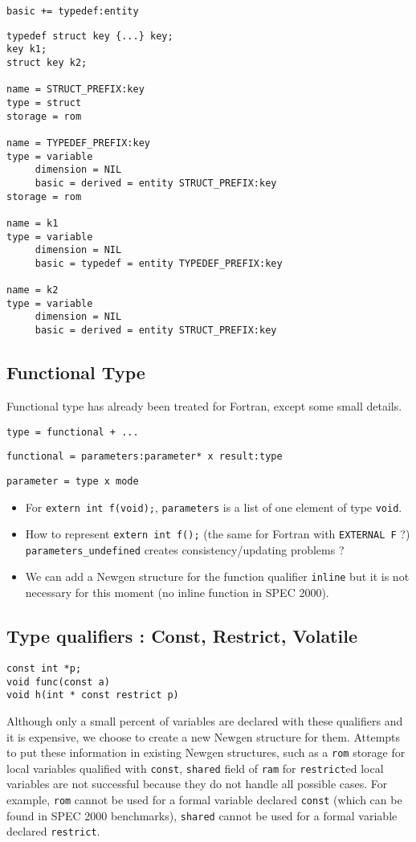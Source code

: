 \documentclass[a4paper]{article}
\begin{document}
\verb/basic += typedef:entity/ 

\begin{verbatim}
typedef struct key {...} key;
key k1;
struct key k2; 

name = STRUCT_PREFIX:key
type = struct  
storage = rom 

name = TYPEDEF_PREFIX:key 
type = variable 
     dimension = NIL
     basic = derived = entity STRUCT_PREFIX:key
storage = rom

name = k1
type = variable 
     dimension = NIL
     basic = typedef = entity TYPEDEF_PREFIX:key

name = k2
type = variable 
     dimension = NIL
     basic = derived = entity STRUCT_PREFIX:key
\end{verbatim}  
\subsection{Functional Type}
Functional type has already been treated for Fortran, except some small details.

\verb/type = functional + .../

\verb/functional = parameters:parameter* x result:type/

\verb/parameter = type x mode /

\begin{itemize}
\item For \verb/extern int f(void);/, \verb/parameters/ is a list of one element of type
\verb/void/.
\item How to represent \verb/extern int f();/ (the same for Fortran with
\verb/EXTERNAL F/ ?) \verb/parameters_undefined/ creates
consistency/updating problems ?
\item We can add a Newgen structure for the function qualifier \verb/inline/ but
it is not necessary for this moment (no inline function in SPEC 2000).
\end{itemize}
\subsection{Type qualifiers : Const, Restrict, Volatile}
\label{type_qualifiers}
\begin{verbatim}
const int *p;
void func(const a)
void h(int * const restrict p)
\end{verbatim}
Although only a small percent of variables are declared with these
qualifiers and it is expensive, we choose to create a new Newgen structure for them. Attempts
to put these information in existing Newgen
structures, such as a \verb/rom/
storage for local variables qualified with \verb/const/, \verb/shared/
field of \verb/ram/ for \verb/restrict/ed local variables are not
successful because they do not handle all possible
cases. For example, \verb/rom/ cannot be used for a formal variable declared \verb/const/ (which
can be found in SPEC 2000 benchmarks),  \verb/shared/ cannot be used for a
formal variable declared \verb/restrict/.  
\end{document}
